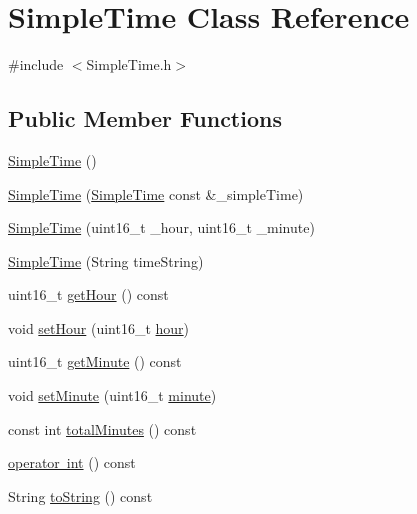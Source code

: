 \hypertarget{class_simple_time}{}\section{Simple\+Time Class Reference}
\label{class_simple_time}


{\ttfamily \#include $<$Simple\+Time.\+h$>$}

\subsection*{Public Member Functions}
\begin{DoxyCompactItemize}
\item 
\mbox{\hyperlink{class_simple_time_adbc19913746c729324ba93d1efd82a0d}{Simple\+Time}} ()
\item 
\mbox{\hyperlink{class_simple_time_abf929f0ba662f85ab42a9d2eb6a98a4d}{Simple\+Time}} (\mbox{\hyperlink{class_simple_time}{Simple\+Time}} const \&\+\_\+simple\+Time)
\item 
\mbox{\hyperlink{class_simple_time_ac9bd49ce2f132b593d3d0d47c9efdb08}{Simple\+Time}} (uint16\+\_\+t \+\_\+hour, uint16\+\_\+t \+\_\+minute)
\item 
\mbox{\hyperlink{class_simple_time_a95825a96f5afb95060a3b36d78ac11e9}{Simple\+Time}} (String time\+String)
\item 
uint16\+\_\+t \mbox{\hyperlink{class_simple_time_a386922a41d88aaab69497730b163cadf}{get\+Hour}} () const
\item 
void \mbox{\hyperlink{class_simple_time_aba0375d3ee93859fdb37b15532c149a4}{set\+Hour}} (uint16\+\_\+t \mbox{\hyperlink{class_simple_time_a3818c7ef3b2f7d685e403f6bbf993bdc}{hour}})
\item 
uint16\+\_\+t \mbox{\hyperlink{class_simple_time_a02c7df278fb87be73998306330198018}{get\+Minute}} () const
\item 
void \mbox{\hyperlink{class_simple_time_ac5b1e04be8f134f378950dcb6f22f966}{set\+Minute}} (uint16\+\_\+t \mbox{\hyperlink{class_simple_time_ad8cfa601eddca64717e27a8ec95cddfa}{minute}})
\item 
const int \mbox{\hyperlink{class_simple_time_a9fd5a5025ccd3bd60d4049c5c113ec4c}{total\+Minutes}} () const
\item 
\mbox{\hyperlink{class_simple_time_a9d034d06249024ed0366c99029243168}{operator int}} () const
\item 
String \mbox{\hyperlink{class_simple_time_a9de383bf9aaf23dbba9b13e0b9b4f0ed}{to\+String}} () const
\end{DoxyCompactItemize}
